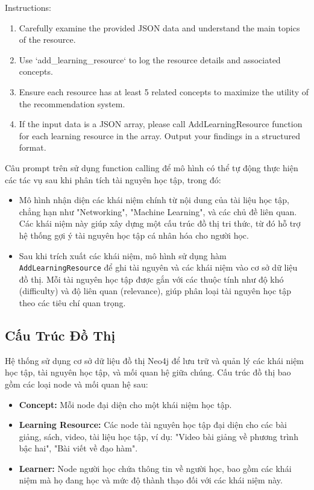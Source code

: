 Instructions:
\begin{enumerate}
    \item Carefully examine the provided JSON data and understand the main topics of the resource.
    \item Use `add\_learning\_resource` to log the resource details and associated concepts.
    \item Ensure each resource has at least 5 related concepts to maximize the utility of the recommendation system.
    \item If the input data is a JSON array, please call AddLearningResource function for each learning
resource in the array.
Output your findings in a structured format.
\end{enumerate}
Câu prompt trên sử dụng function calling để mô hình có thể tự động thực hiện các tác vụ sau khi phân tích tài nguyên học tập, trong đó:
\begin{itemize}
    \item  Mô hình nhận diện các khái niệm chính từ nội dung của tài liệu học tập, chẳng hạn như "Networking", "Machine Learning", và các chủ đề liên quan. Các khái niệm này giúp xây dựng một cấu trúc đồ thị tri thức, từ đó hỗ trợ hệ thống gợi ý tài nguyên học tập cá nhân hóa cho người học.
    \item Sau khi trích xuất các khái niệm, mô hình sử dụng hàm \texttt{AddLearningResource} để ghi tài nguyên và các khái niệm vào cơ sở dữ liệu đồ thị. Mỗi tài nguyên học tập được gắn với các thuộc tính như độ khó (difficulty) và độ liên quan (relevance), giúp phân loại tài nguyên học tập theo các tiêu chí quan trọng.
\end{itemize}

\subsection{Cấu Trúc Đồ Thị}
Hệ thống sử dụng cơ sở dữ liệu đồ thị Neo4j để lưu trữ và quản lý các khái niệm học tập, tài nguyên học tập, và mối quan hệ giữa chúng. Cấu trúc đồ thị bao gồm các loại node và mối quan hệ sau:

\begin{itemize}
    \item \textbf{Concept:} Mỗi node đại diện cho một khái niệm học tập.
    \item \textbf{Learning Resource:} Các node tài nguyên học tập đại diện cho các bài giảng, sách, video, tài liệu học tập, ví dụ: "Video bài giảng về phương trình bậc hai", "Bài viết về đạo hàm".
    \item \textbf{Learner:} Node người học chứa thông tin về người học, bao gồm các khái niệm mà họ đang học và mức độ thành thạo đối với các khái niệm này.
\end{itemize}

